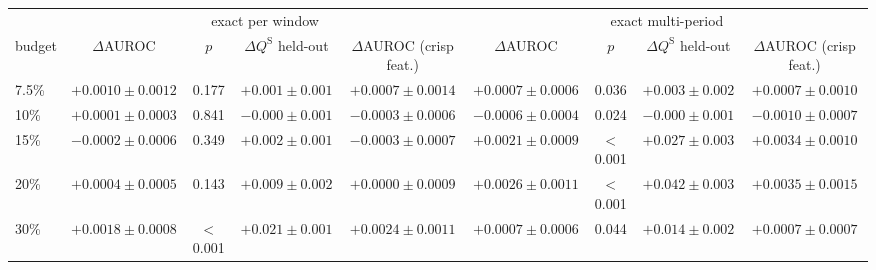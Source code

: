 \begin{tabular}{lcccccccc}
\toprule
& \multicolumn{4}{c}{exact per window} & \multicolumn{4}{c}{exact multi-period} \\
\cmidrule(lr){2-5}\cmidrule(lr){6-9}
budget & $\Delta$AUROC & $p$ & $\Delta Q^{\mathrm S}$ held-out & $\Delta$AUROC (crisp feat.) & $\Delta$AUROC & $p$ & $\Delta Q^{\mathrm S}$ held-out & $\Delta$AUROC (crisp feat.) \\
\midrule
7.5\% & $+0.0010\pm0.0012$ & 0.177 & $+0.001\pm0.001$ & $+0.0007\pm0.0014$ & $+0.0007\pm0.0006$ & 0.036 & $+0.003\pm0.002$ & $+0.0007\pm0.0010$ \\
10\% & $+0.0001\pm0.0003$ & 0.841 & $-0.000\pm0.001$ & $-0.0003\pm0.0006$ & $-0.0006\pm0.0004$ & 0.024 & $-0.000\pm0.001$ & $-0.0010\pm0.0007$ \\
15\% & $-0.0002\pm0.0006$ & 0.349 & $+0.002\pm0.001$ & $-0.0003\pm0.0007$ & $+0.0021\pm0.0009$ & $<$0.001 & $+0.027\pm0.003$ & $+0.0034\pm0.0010$ \\
20\% & $+0.0004\pm0.0005$ & 0.143 & $+0.009\pm0.002$ & $+0.0000\pm0.0009$ & $+0.0026\pm0.0011$ & $<$0.001 & $+0.042\pm0.003$ & $+0.0035\pm0.0015$ \\
30\% & $+0.0018\pm0.0008$ & $<$0.001 & $+0.021\pm0.001$ & $+0.0024\pm0.0011$ & $+0.0007\pm0.0006$ & 0.044 & $+0.014\pm0.002$ & $+0.0007\pm0.0007$ \\
\bottomrule
\end{tabular}